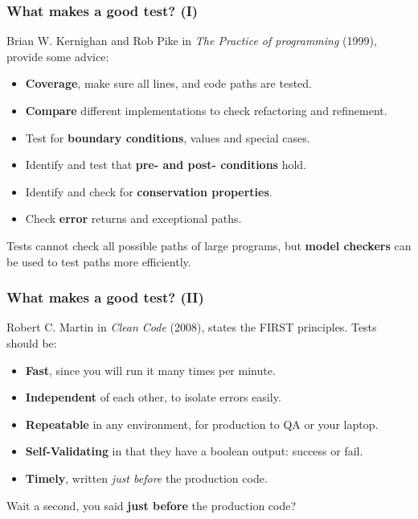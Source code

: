 \documentclass{beamer} %
\newcommand\emc[1]{\textcolor{brightblue}{\textbf{#1}}}
\begin{document}
\begin{frame}
\frametitle{What makes a good test? (I)}

Brian W. Kernighan and Rob Pike in  \emph{The Practice of programming} (1999), provide some advice:
\begin{itemize}
	\item \emc{Coverage}, make sure all lines, and code paths are tested.
	\item \emc{Compare} different implementations to check refactoring and refinement.
	\item Test for \emc{boundary conditions}, values and special cases.
	\item Identify and test that \emc{pre- and post- conditions} hold.
	\item Identify and check for \emc{conservation properties}.
	\item Check \emc{error} returns and exceptional paths.
\end{itemize}

\vspace{3mm}
Tests cannot check all possible paths of large programs, but \emc{model checkers} can be used to test paths more efficiently.

\end{frame}

\begin{frame}
\frametitle{What makes a good test? (II)}

Robert C. Martin in \emph{Clean Code} (2008), states the FIRST principles. Tests should be:
\begin{itemize}
	\item \emc{Fast}, since you will run it many times per minute.
	\item \emc{Independent} of each other, to isolate errors easily. 
	\item \emc{Repeatable} in any environment, for production to QA or your laptop.
	\item \emc{Self-Validating} in that they have a boolean output: success or fail.
	\item \emc{Timely}, written \emph{just before} the production code.
\end{itemize}

\vspace{5mm}
Wait a second, you said \emc{just before} the production code?

\end{frame}
\end{document}
